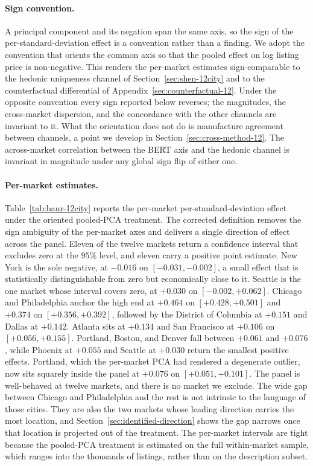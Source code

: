 \paragraph{Sign convention.} A principal component and its negation span the
same axis, so the sign of the per-standard-deviation effect is a convention
rather than a finding. We adopt the convention that orients the common axis so
that the pooled effect on log listing price is non-negative. This renders the
per-market estimates sign-comparable to the hedonic uniqueness channel of
Section~\ref{sec:shen-12city} and to the counterfactual differential of
Appendix~\ref{sec:counterfactual-12}. Under the opposite convention every sign
reported below reverses; the magnitudes, the cross-market dispersion, and the
concordance with the other channels are invariant to it. What the orientation
does not do is manufacture agreement between channels, a point we develop in
Section~\ref{sec:cross-method-12}. The across-market correlation between
the BERT axis and the hedonic channel is invariant in magnitude under any global
sign flip of either one.

\paragraph{Per-market estimates.} Table~\ref{tab:baur-12city} reports the
per-market per-standard-deviation effect under the oriented pooled-PCA
treatment. The corrected definition removes the sign ambiguity of the per-market
axes and delivers a single direction of effect across the panel. Eleven of the
twelve markets return a confidence interval that excludes zero at the $95\%$
level, and eleven carry a positive point estimate. New York is the
sole negative, at $-0.016$ on $[-0.031, -0.002]$, a small effect that is
statistically distinguishable from zero but economically close to it. Seattle
is the one market whose interval covers zero, at $+0.030$ on
$[-0.002, +0.062]$. Chicago and Philadelphia anchor the high end at $+0.464$ on
$[+0.428, +0.501]$ and $+0.374$ on $[+0.356, +0.392]$, followed by the District
of Columbia at $+0.151$ and Dallas at $+0.142$. Atlanta sits at $+0.134$ and
San Francisco at $+0.106$ on $[+0.056, +0.155]$. Portland, Boston, and Denver
fall between $+0.061$ and $+0.076$, while Phoenix at $+0.055$ and Seattle at
$+0.030$ return the smallest positive effects. Portland, which the per-market PCA had
rendered a degenerate outlier, now sits squarely inside the panel at $+0.076$ on
$[+0.051, +0.101]$. The panel is well-behaved at twelve markets, and there is no
market we exclude. The wide gap between Chicago and Philadelphia and the rest is not
intrinsic to the language of those cities. They are also the two markets whose
leading direction carries the most location, and
Section~\ref{sec:identified-direction} shows the gap narrows once that location is
projected out of the treatment. The per-market intervals are tight
because the pooled-PCA treatment is estimated on the full within-market sample,
which ranges into the thousands of listings, rather than on the description
subset.

